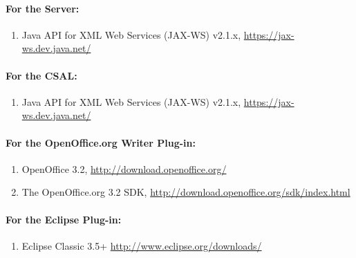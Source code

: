 \paragraph{For the \sa Server:}
\begin{enumerate}
  \item Java API for XML Web Services (JAX-WS) v2.1.x, \url{https://jax-ws.dev.java.net/}
\end{enumerate}

\paragraph{For the CSAL:}
\begin{enumerate}
  \item Java API for XML Web Services (JAX-WS) v2.1.x, \url{https://jax-ws.dev.java.net/}
\end{enumerate}

\paragraph{For the OpenOffice.org Writer Plug-in:}
\begin{enumerate}
\item OpenOffice 3.2, \url{http://download.openoffice.org/}
\item The OpenOffice.org 3.2 SDK,
  \url{http://download.openoffice.org/sdk/index.html}
\end{enumerate}

\paragraph{For the Eclipse Plug-in:}
\begin{enumerate}
\item Eclipse Classic 3.5+ \url{http://www.eclipse.org/downloads/}
\end{enumerate}



